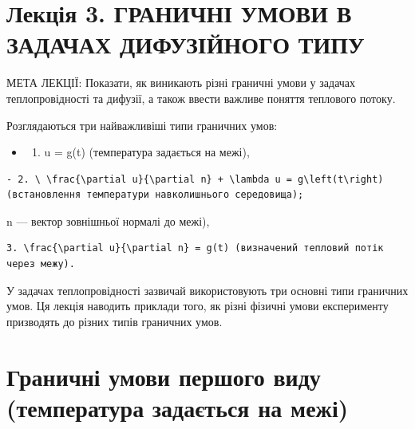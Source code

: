 \documentclass[
  ukrainian,
]{article}
\providecommand{\tightlist}{%
  \setlength{\itemsep}{0pt}\setlength{\parskip}{0pt}}
\begin{document}
\section{Лекція 3. ГРАНИЧНІ УМОВИ В ЗАДАЧАХ ДИФУЗІЙНОГО
ТИПУ}\label{ux43bux435ux43aux446ux456ux44f-3.-ux433ux440ux430ux43dux438ux447ux43dux456-ux443ux43cux43eux432ux438-ux432-ux437ux430ux434ux430ux447ux430ux445-ux434ux438ux444ux443ux437ux456ux439ux43dux43eux433ux43e-ux442ux438ux43fux443}

МЕТА ЛЕКЦІЇ: Показати, як виникають різні граничні умови у задачах
теплопровідності та дифузії, а також ввести важливе поняття теплового
потоку.

Розглядаються три найважливіші типи граничних умов:

\begin{itemize}
\tightlist
\item
  \begin{enumerate}
  \def\labelenumi{\arabic{enumi}.}
  \tightlist
  \item
    u = g(t) (температура задається на межі),
  \end{enumerate}
\end{itemize}

\begin{verbatim}
- 2. \ \frac{\partial u}{\partial n} + \lambda u = g\left(t\right) (встановлення температури навколишнього середовища);
\end{verbatim}

n --- вектор зовнішньої нормалі до межі),

\begin{verbatim}
3. \frac{\partial u}{\partial n} = g(t) (визначений тепловий потік через межу).
\end{verbatim}

У задачах теплопровідності зазвичай використовують три основні типи
граничних умов. Ця лекція наводить приклади того, як різні фізичні умови
експерименту призводять до різних типів граничних умов.

\section{Граничні умови першого виду (температура задається на
межі)}\label{ux433ux440ux430ux43dux438ux447ux43dux456-ux443ux43cux43eux432ux438-ux43fux435ux440ux448ux43eux433ux43e-ux432ux438ux434ux443-ux442ux435ux43cux43fux435ux440ux430ux442ux443ux440ux430-ux437ux430ux434ux430ux454ux442ux44cux441ux44f-ux43dux430-ux43cux435ux436ux456}
\end{document}
